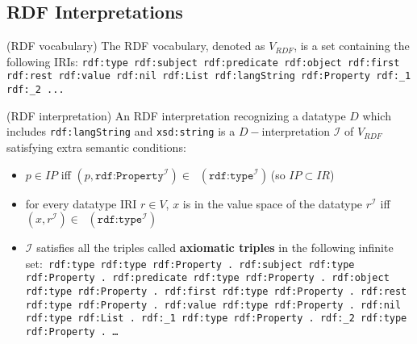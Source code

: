 \documentclass{article}
\DeclareMathOperator{\IEXT}{I_{EXT}}
\begin{document}
\subsection{RDF Interpretations}
\begin{defin}(RDF vocabulary)\newline
The RDF vocabulary, denoted as $V_{RDF}$, is a set containing the following IRIs:\newline
\texttt{rdf:type rdf:subject rdf:predicate rdf:object rdf:first rdf:rest rdf:value rdf:nil rdf:List rdf:langString rdf:Property rdf:\_1 rdf:\_2 ...}
\end{defin}

\begin{defin}(RDF interpretation)\newline
An RDF interpretation recognizing a datatype $D$ which includes \texttt{rdf:langString} and \texttt{xsd:string} is a $D-$interpretation $\mathcal{I}$ of $V_{RDF}$ satisfying extra semantic conditions:
\begin{itemize}
\item $p \in IP$ iff $(p,\texttt{rdf:Property}^{\mathcal{I}}) \in \IEXT(\texttt{rdf:type}^{\mathcal{I}})$\,(so $IP \subset IR$)
\item for every datatype IRI $r \in V$, $x$ is in the value space of the datatype $r^{\mathcal{I}}$ iff $(x,r^{\mathcal{I}}) \in \IEXT(\texttt{rdf:type}^{\mathcal{I}})$
\item $\mathcal{I}$ satisfies all the triples called \textbf{axiomatic triples} in the following infinite set:\newline\texttt{
rdf:type rdf:type rdf:Property .\newline
rdf:subject rdf:type rdf:Property .\newline
rdf:predicate rdf:type rdf:Property . \newline
rdf:object rdf:type rdf:Property . \newline
rdf:first rdf:type rdf:Property . \newline
rdf:rest rdf:type rdf:Property . \newline
rdf:value rdf:type rdf:Property . \newline
rdf:nil rdf:type rdf:List . \newline
rdf:\_1 rdf:type rdf:Property . \newline
rdf:\_2 rdf:type rdf:Property . \newline
\dots}
\end{itemize}
\end{defin}
\end{document}

